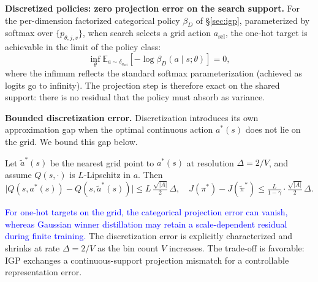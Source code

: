 \textbf{Discretized policies: zero projection error on the search support.}
For the per-dimension factorized categorical policy $\beta_D$ of \S\ref{sec:igp}, parameterized by softmax over $\{p_{\theta,j,v}\}$, when search selects a grid action $a_{\mathrm{sel}}$, the one-hot target is achievable in the limit of the policy class:
\begin{equation}
    \inf_{\theta} \mathbb{E}_{a\sim\delta_{a_{\mathrm{sel}}}}\!\left[-\log\beta_D(a\mid s;\theta)\right] = 0,
\end{equation}
where the infimum reflects the standard softmax parameterization (achieved as logits go to infinity). The projection step is therefore exact on the shared support: there is no residual that the policy must absorb as variance.

\textbf{Bounded discretization error.}
Discretization introduces its own approximation gap when the optimal continuous action $a^*(s)$ does not lie on the grid. We bound this gap below.

\begin{lemma}
\label{lem:discretization_error}
Let $\tilde a^*(s)$ be the nearest grid point to $a^*(s)$ at resolution $\Delta=2/V$, and assume $Q(s,\cdot)$ is $L$-Lipschitz in $a$. Then
\[
\big|Q(s,a^*(s))-Q(s,\tilde a^*(s))\big| \le L\,\tfrac{\sqrt{|A|}}{2}\,\Delta,
\quad
J(\pi^*) - J(\tilde\pi^*) \le \tfrac{L}{1-\gamma}\cdot\tfrac{\sqrt{|A|}}{2}\,\Delta.
\]
\end{lemma}

\textcolor{blue}{For one-hot targets on the grid, the categorical projection error can vanish, whereas Gaussian winner distillation may retain a scale-dependent residual during finite training.} The discretization error is explicitly characterized and shrinks at rate $\Delta=2/V$ as the bin count $V$ increases. The trade-off is favorable: IGP exchanges a continuous-support projection mismatch for a controllable representation error.
